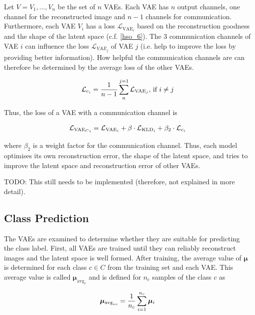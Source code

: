 Let $V = {V_1, ..., V_n}$ be the set of $n$ VAEs. Each VAE has $n$ output channels, one channel for the reconstructed image and $n-1$ channels for communication. Furthermore, each VAE $V_i$ has a loss $\mathcal{L}_{\text{VAE}_i}$ based on the reconstruction goodness and the shape of the latent space (c.f. \eqref{hso_6}). The $3$ communication channels of VAE $i$ can influence the loss $\mathcal{L}_{VAE_j}$ of VAE $j$ (i.e. help to improve the loss by providing better information). How helpful the communication channels are can therefore be determined by the average loss of the other VAEs.

\begin{align}\eqlbl{hso_9}
	\mathcal{L}_{c_i} = \frac{1}{n-1} \sum_{n}^{j=1} \mathcal{L}_{\text{VAE}_j} \text{, if } i \neq j
\end{align}

Thus, the loss of a VAE with a communication channel is

\begin{align}\eqlbl{hso_10}
		\mathcal{L}_{{\text{VAE}_C}_i} = \mathcal{L}_{\text{VAE}_i} + \beta \cdot \mathcal{L}_{\text{KLD}_i} + \beta_2 \cdot \mathcal{L}_{c_i}
\end{align}

where $\beta_2$ is a weight factor for the communication channel. Thus, each model optimises its own reconstruction error, the shape of the latent space, and tries to improve the latent space and reconstruction error of other VAEs.


TODO: This still needs to be implemented (therefore, not explained in more detail).

\subsection{Class Prediction}
The VAEs are examined to determine whether they are suitable for predicting the class label. First, all VAEs are trained until they can reliably reconstruct images and the latent space is well formed.
After training, the average value of $\boldsymbol{\mu}$ is determined for each class $c \in C$ from the training set and each VAE. This average value is called $\boldsymbol{\mu}_{\text{avg}_c}$ and is defined for $n_c$ samples of the class $c$ as

\begin{align}\eqlbl{hso_12}
		\boldsymbol{\mu}_{\text{avg}_{vc}} = \frac{1}{n_c} \sum_{i=1}^{n_c} \boldsymbol{\mu}_i
\end{align}

